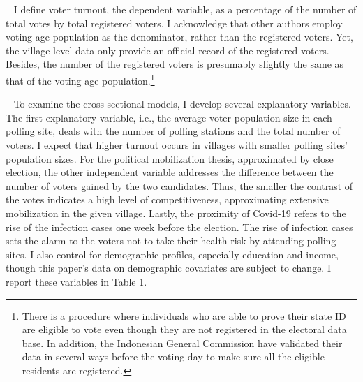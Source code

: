 \documentclass[
  12pt,
]{article}
\begin{document}
~ I define voter turnout, the dependent variable, as a percentage of the
number of total votes by total registered voters. I acknowledge that
other authors employ voting age population as the denominator, rather
than the registered voters. Yet, the village-level data only provide an
official record of the registered voters. Besides, the number of the
registered voters is presumably slightly the same as that of the
voting-age population.\footnote{There is a procedure where individuals
  who are able to prove their state ID are eligible to vote even though
  they are not registered in the electoral data base. In addition, the
  Indonesian General Commission have validated their data in several
  ways before the voting day to make sure all the eligible residents are
  registered.}

~ To examine the cross-sectional models, I develop several explanatory
variables. The first explanatory variable, i.e., the average voter
population size in each polling site, deals with the number of polling
stations and the total number of voters. I expect that higher turnout
occurs in villages with smaller polling sites' population sizes. For the
political mobilization thesis, approximated by close election, the other
independent variable addresses the difference between the number of
voters gained by the two candidates. Thus, the smaller the contrast of
the votes indicates a high level of competitiveness, approximating
extensive mobilization in the given village. Lastly, the proximity of
Covid-19 refers to the rise of the infection cases one week before the
election. The rise of infection cases sets the alarm to the voters not
to take their health risk by attending polling sites. I also control for
demographic profiles, especially education and income, though this
paper's data on demographic covariates are subject to change. I report
these variables in Table 1.
\end{document}
